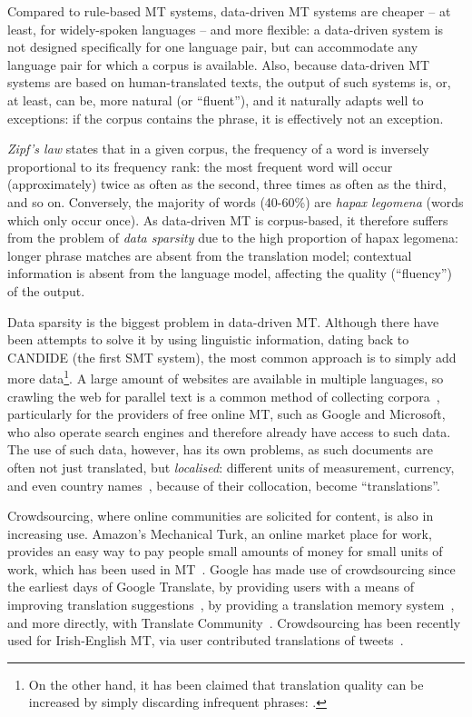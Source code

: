 Compared to rule-based MT systems, data-driven MT systems are cheaper -- at least, for widely-spoken 
languages -- and more flexible: a data-driven system is not designed specifically for one language 
pair, but can accommodate any language pair for which a corpus is available. Also, because data-driven 
MT systems are based on human-translated texts, the output of such systems is, or, at least, can be, 
more natural (or ``fluent''), and it naturally adapts well to exceptions: if the corpus contains the 
phrase, it is effectively not an exception.

\textit{Zipf's law} states that in a given corpus, the frequency of a word is inversely proportional 
to its frequency rank: the most frequent word will occur (approximately) twice as often as the second, 
three times as often as the third, and so on. Conversely, the majority of words (40-60\%) are 
\textit{hapax legomena} (words which only occur once). As data-driven MT is corpus-based, it therefore 
suffers from the problem of \textit{data sparsity} due to the high proportion of hapax legomena: longer 
phrase matches are absent from the translation model; contextual information is absent from the language 
model, affecting the quality (``fluency'') of the output.

Data sparsity is the biggest problem in data-driven MT. Although there have been attempts to solve it 
by using linguistic information, dating back to CANDIDE (the first SMT system), the most common approach 
is to simply add more data\footnote{On the other hand, it has been claimed that translation quality can be 
increased by simply discarding infrequent phrases: \citet{Johnson07improvingtranslation}.}. A large 
amount of websites are available in multiple languages, so crawling the web for parallel text is a 
common method of collecting corpora~\citep{zora80038}, particularly for the providers of free online 
MT, such as Google and Microsoft, who also operate search engines and therefore already have access to 
such data. The use of such data, however, has its own problems, as such documents are often not just 
translated, but \textit{localised}: different units of measurement, currency, and even country 
names~\citep{quince08}, because of their collocation, become ``translations''. 

Crowdsourcing, where online communities are solicited for content, is also in increasing use. Amazon's 
Mechanical Turk, an online market place for work, provides an easy way to pay people small amounts of 
money for small units of work, which has been used in MT~\citep{zaidan2011}. Google has made use of 
crowdsourcing since the earliest days of Google Translate, by providing users with a means of improving 
translation suggestions~\citep{chin07suggest}, by providing a translation memory 
system~\citep{galvez09toolkit}, and more directly, with Translate Community~\citep{kelman14community}. 
Crowdsourcing has been recently used for Irish-English MT, via user contributed translations of 
tweets~\citep{dowling2017crowd}.

